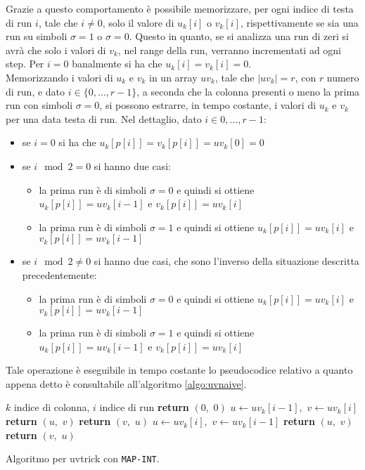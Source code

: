 Grazie a questo comportamento è possibile memorizzare, per ogni indice di
testa di run $i$, tale che $i\neq 0$, solo il valore di $u_k[i]$ o $v_k[i]$,
rispettivamente se sia una run su simboli $\sigma=1$ o $\sigma=0$. Questo in
quanto, se si analizza una run di zeri si avrà che solo i valori di $v_k$, nel
range della run, verranno incrementati ad ogni step. Per $i=0$ banalmente si ha
che $u_k[i]=v_k[i]=0$.\\
Memorizzando i valori di $u_k$ e $v_k$ in un array $uv_k$, tale che $|uv_k|=r$,
con $r$ numero di run, e dato $i\in\{0,\ldots, r-1\}$, a seconda che la colonna
presenti o meno la prima run  
con simboli $\sigma=0$, si possono estrarre, in tempo costante, i valori di
$u_k$ e $v_k$ per una data testa di run. Nel dettaglio, dato $i\in{0,\ldots,
  r-1}$:
\begin{itemize}
  \item se $i=0$ si ha che $u_k[p[i]]=v_k[p[i]]=uv_k[0]=0$
  \item se $i\mod 2 =0$ si hanno due casi:
  \begin{itemize}
    \item la prima run è di simboli $\sigma=0$ e quindi si ottiene
    $u_k[p[i]]=uv_k[i-1]$ e $v_k[p[i]]=uv_k[i]$
    \item la prima run è di simboli $\sigma=1$ e quindi si ottiene
    $u_k[p[i]]=uv_k[i]$ e $v_k[p[i]]=uv_k[i-1]$
  \end{itemize}
  \item se $i\mod 2 \neq 0$ si hanno due casi, che sono l'inverso della
  situazione descritta precedentemente:
  \begin{itemize}
    \item la prima run è di simboli $\sigma=0$ e quindi si ottiene
    $u_k[p[i]]=uv_k[i]$ e $v_k[p[i]]=uv_k[i-1]$
    \item la prima run è di simboli $\sigma=1$ e quindi si ottiene
    $u_k[p[i]]=uv_k[i-1]$ e $v_k[p[i]]=uv_k[i]$   
  \end{itemize}
\end{itemize}
Tale operazione è eseguibile in tempo costante lo pseudocodice relativo a
quanto appena detto è consultabile all'algoritmo \ref{algo:uvnaive}.
\begin{algorithm}
  \small
  \begin{algorithmic}[1]
    \Comment $k$ indice di colonna, $i$ indice di run
    \State \textbf{return} $(0,\,\,0)$
    \State $u\gets uv_k[i-1],\,\,v\gets uv_k[i]$
    \State \textbf{return} $(u,\,\,v)$
    \Else
    \State \textbf{return} $(v,\,\,u)$
    \EndIf
    \Else
    \State $u\gets uv_k[i],\,\,v\gets uv_k[i-1]$
    \State \textbf{return} $(u,\,\,v)$
    \Else
    \State \textbf{return} $(v,\,\,u)$
    \EndIf
    \EndIf
    \EndFunction
  \end{algorithmic}
  \caption{Algoritmo per uvtrick con \texttt{MAP-INT}.}
  \label{algo:uvnaive}
\end{algorithm}

